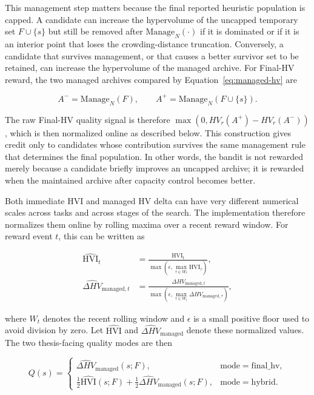 This management step matters because the final reported heuristic population is capped. A candidate can increase the hypervolume of the uncapped temporary set $F\cup\{s\}$ but still be removed after $\mathrm{Manage}_N(\cdot)$ if it is dominated or if it is an interior point that loses the crowding-distance truncation. Conversely, a candidate that survives management, or that causes a better survivor set to be retained, can increase the hypervolume of the managed archive. For Final-HV reward, the two managed archives compared by Equation~\ref{eq:managed-hv} are

\begin{equation}
  A^-=\mathrm{Manage}_N(F),
  \qquad
  A^+=\mathrm{Manage}_N(F\cup\{s\}).
\end{equation}

The raw Final-HV quality signal is therefore $\max(0,HV_r(A^+)-HV_r(A^-))$, which is then normalized online as described below. This construction gives credit only to candidates whose contribution survives the same management rule that determines the final population. In other words, the bandit is not rewarded merely because a candidate briefly improves an uncapped archive; it is rewarded when the maintained archive after capacity control becomes better.

Both immediate HVI and managed HV delta can have very different numerical scales across tasks and across stages of the search. The implementation therefore normalizes them online by rolling maxima over a recent reward window. For reward event $t$, this can be written as

\begin{align}
  \widehat{\mathrm{HVI}}_t
  &=
  \frac{\mathrm{HVI}_t}
  {\max\left(\epsilon,\max_{\tau\in W_t}\mathrm{HVI}_\tau\right)},\\
  \widehat{\Delta HV}_{\mathrm{managed},t}
  &=
  \frac{\Delta HV_{\mathrm{managed},t}}
  {\max\left(\epsilon,\max_{\tau\in W_t}\Delta HV_{\mathrm{managed},\tau}\right)},
\end{align}

where $W_t$ denotes the recent rolling window and $\epsilon$ is a small positive floor used to avoid division by zero. Let $\widehat{\mathrm{HVI}}$ and $\widehat{\Delta HV}_{\mathrm{managed}}$ denote these normalized values. The two thesis-facing quality modes are then

\begin{equation}
  Q(s)=
  \begin{cases}
    \widehat{\Delta HV}_{\mathrm{managed}}(s;F),
    & \mathrm{mode}=\mathrm{final\_hv},\\
    \frac{1}{2}\widehat{\mathrm{HVI}}(s;F)
    +\frac{1}{2}\widehat{\Delta HV}_{\mathrm{managed}}(s;F),
    & \mathrm{mode}=\mathrm{hybrid}.
  \end{cases}
\end{equation}

